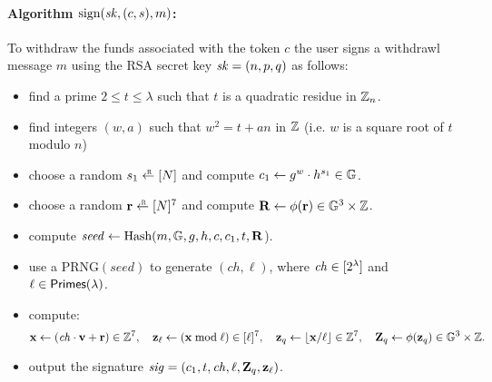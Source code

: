 \documentclass[11pt]{article}
\begin{document}
\paragraph{Algorithm $\text{sign}(\mathit{sk}, (c, s), m)$:}  
To withdraw the funds associated with the token $c$ the user
signs a withdrawl message $m$ using the RSA secret key $\mathit{sk} = (n,p,q)$ 
as follows:
\begin{itemize}
\item find a prime $2 \leq t \leq \lambda$  such that $t$ is a quadratic 
residue in $\mathbb Z_n$. 

\item find integers $(w,a)$ such that $w^2 = t + a n$ in $\mathbb Z$
           (i.e. $w$ is a square root of $t$ modulo $n$)

\item choose a random $s_1 \rgets \range{N}$ and compute
           $c_1 \gets g^w \cdot h^{s_1} \in \mathbb G$.

\item choose a random $\rv \rgets \range{N}^7$
and compute $\mathbf{R} \gets \phi(\mathbf{r}) \in \mathbb G^3 \times \mathbb Z$.

\item compute $\mathit{seed} \gets \text{Hash}(m, \mathbb G, g, h, c, c_1, t, \mathbf{R}$).

\item
use a $\text{PRNG}(\mathit{seed})$ to generate $(\mathit{ch}, \ell)$, 
where $\mathit{ch} \in [{2^\lambda}]$ and $\ell \in \textsf{Primes}(\lambda)$.

\item compute:
\[  \mathbf{x} \gets (\mathit{ch} \cdot \mathbf{v} + \mathbf{r}) \in \mathbb Z^7, \quad
    \mathbf{z}_\ell \gets (\mathbf{x} \bmod \ell) \in [{\ell}]^7, \quad
    \mathbf{z}_q \gets \lfloor \mathbf{x} / \ell \rfloor \in \mathbb Z^7, \quad
    \mathbf{Z}_q \gets \phi(\mathbf{z}_q) \in \mathbb G^3 \times \mathbb Z.
\]

\item output the signature 
$\mathit{sig} = (c_1, t, \mathit{ch}, \ell, \mathbf{Z}_q, \mathbf{z}_\ell)$.
\end{itemize}
\end{document}
